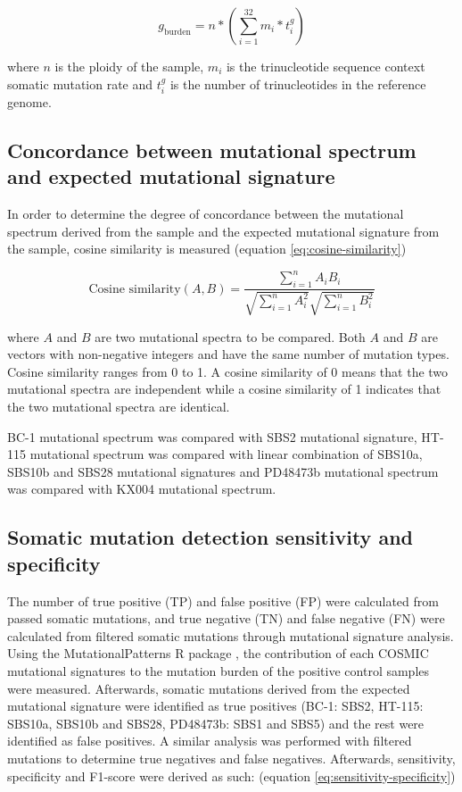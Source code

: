 \begin{equation} \label{eq:mutation-burden-per-cell}
g_{\text{burden}} = n * (\sum^{32}_{i=1} m_{i} * t^{g}_{i})
\end{equation}

where $n$ is the ploidy of the sample, $m_{i}$ is the trinucleotide sequence context somatic mutation rate and $t^{g}_{i}$ is the number of trinucleotides in the reference genome.

\subsection{Concordance between mutational spectrum and expected mutational signature}

In order to determine the degree of concordance between the mutational spectrum derived from the sample and the expected mutational signature from the sample, cosine similarity is measured (equation \ref{eq:cosine-similarity})

\begin{equation} 
\label{eq:cosine-similarity}
\text{Cosine similarity} (A,B) = \frac{\sum^{n}_{i=1}A_{i}B_{i}}{\sqrt{\sum^{n}_{i=1}A^{2}_{i}}\sqrt{\sum^{n}_{i=1}B^{2}_{i}}}
\end{equation}

where $A$ and $B$ are two mutational spectra to be compared. Both $A$ and $B$ are vectors with non-negative integers and have the same number of mutation types. Cosine similarity ranges from 0 to 1. A cosine similarity of 0 means that the two mutational spectra are independent while a cosine similarity of 1 indicates that the two mutational spectra are identical. 

BC-1 mutational spectrum was compared with SBS2 mutational signature, HT-115 mutational spectrum was compared with linear combination of SBS10a, SBS10b and SBS28 mutational signatures and PD48473b mutational spectrum was compared with KX004 mutational spectrum.

\subsection{Somatic mutation detection sensitivity and specificity}

The number of true positive (TP) and false positive (FP) were calculated from passed somatic mutations, and true negative (TN) and false negative (FN) were calculated from filtered somatic mutations through mutational signature analysis. Using the MutationalPatterns R package \cite{Blokzijl2018-jo}, the contribution of each COSMIC mutational signatures to the mutation burden of the positive control samples were measured. Afterwards, somatic mutations derived from the expected mutational signature were identified as true positives (BC-1: SBS2, HT-115: SBS10a, SBS10b and SBS28, PD48473b: SBS1 and SBS5) and the rest were identified as false positives. A similar analysis was performed with filtered mutations to determine true negatives and false negatives. Afterwards, sensitivity, specificity and F1-score were derived as such: (equation \ref{eq:sensitivity-specificity})


